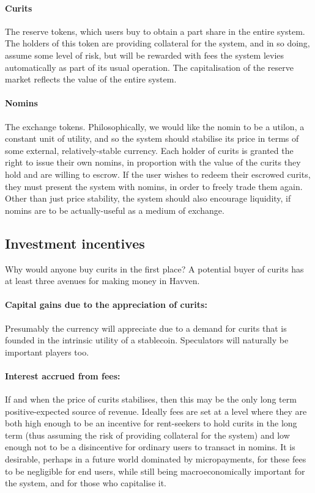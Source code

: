 \documentclass{article}
\begin{document}
\paragraph{Curits} The reserve tokens, which users buy to obtain a part share in the entire system. The holders
of this token are providing collateral for the system, and in so doing, assume some level of risk, but will
be rewarded with fees the system levies automatically as part of its usual operation. The capitalisation
of the reserve market reflects the value of the entire system.
\paragraph{Nomins} The exchange tokens. Philosophically, we would like the nomin to be a utilon, a constant
unit of utility, and so the system should stabilise its price in terms of some external, relatively-stable
currency. Each holder of curits is granted the right to issue their own nomins, in proportion with the value
of the curits they hold and are willing to escrow. If the user wishes to redeem their escrowed curits,
they must present the system with nomins, in order to freely trade them again. Other than just price stability,
the system should also encourage liquidity, if nomins are to be actually-useful as a medium of exchange.


\pagebreak
\subsection{Investment incentives}
Why would anyone buy curits in the first place? A potential buyer of curits has at least three avenues for making
money in Havven.

\paragraph{Capital gains due to the appreciation of curits:}
Presumably the currency will appreciate due to a demand for curits that is founded in the intrinsic
utility of a stablecoin. Speculators will naturally be important players too.

\paragraph{Interest accrued from fees:}
If and when the price of curits stabilises, then this may be the only long term positive-expected
source of revenue. Ideally fees are set at a level where they are both high enough to be an incentive
for rent-seekers to hold curits in the long term (thus assuming the risk of providing collateral for
the system) and low enough not to be a disincentive for ordinary users to transact in nomins.
It is desirable, perhaps in a future world dominated by micropayments, for these fees to be
negligible for end users, while still being macroeconomically important for the system, and for those
who capitalise it.
\end{document}
